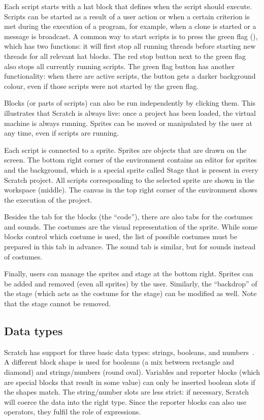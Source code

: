 \documentclass[../main]{subfiles}
\begin{document}
Each script starts with a hat block that defines when the script should execute.
Scripts can be started as a result of a user action or when a certain criterion is met during the execution of a program, for example, when a clone is started or a message is broadcast.
A common way to start scripts is to press the green flag (\greenflag), which has two functions: it will first stop all running threads before starting new threads for all relevant hat blocks.
The red stop button next to the green flag also stops all currently running scripts.
The green flag button has another functionality: when there are active scripts, the button gets a darker background colour, even if those scripts were not started by the green flag.

Blocks (or parts of scripts) can also be run independently by clicking them.
This illustrates that Scratch is always live: once a project has been loaded, the virtual machine is always running.
Sprites can be moved or manipulated by the user at any time, even if scripts are running.

Each script is connected to a sprite.
Sprites are objects that are drawn on the screen.
The bottom right corner of the environment contains an editor for sprites and the background, which is a special sprite called Stage that is present in every Scratch project.
All scripts corresponding to the selected sprite are shown in the workspace (middle).
The canvas in the top right corner of the environment shows the execution of the project.

Besides the tab for the blocks (the ``code''), there are also tabs for the costumes and sounds.
The costumes are the visual representation of the sprite.
While some blocks control which costume is used, the list of possible costumes must be prepared in this tab in advance.
The sound tab is similar, but for sounds instead of costumes.

Finally, users can manage the sprites and stage at the bottom right.
Sprites can be added and removed (even all sprites) by the user.
Similarly, the ``backdrop'' of the stage (which acts as the costume for the stage) can be modified as well.
Note that the stage cannot be removed.

\subsection{Data types}\label{subsec:scratch-data-types}

Scratch has support for three basic data types: strings, booleans, and numbers~\autocite{maloneyScratchProgrammingLanguage2010}.
A different block shape is used for booleans (a mix between rectangle and diamond) and strings/numbers (round oval).
Variables and reporter blocks (which are special blocks that result in some value) can only be inserted boolean slots if the shapes match.
The string/number slots are less strict: if necessary, Scratch will coerce the data into the right type.
Since the reporter blocks can also use operators, they fulfil the role of expressions.
\end{document}
